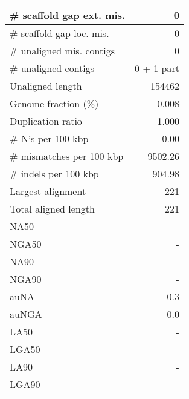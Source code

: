 \documentclass[12pt,a4paper]{article}
\begin{document}
\begin{table}[ht]
\begin{center}
\begin{tabular}{|l*{1}{|r}|}
\# scaffold gap ext. mis. & 0 \\ \hline
\# scaffold gap loc. mis. & 0 \\ \hline
\# unaligned mis. contigs & 0 \\ \hline
\# unaligned contigs & 0 + 1 part \\ \hline
Unaligned length & 154462 \\ \hline
Genome fraction (\%) & 0.008 \\ \hline
Duplication ratio & 1.000 \\ \hline
\# N's per 100 kbp & 0.00 \\ \hline
\# mismatches per 100 kbp & 9502.26 \\ \hline
\# indels per 100 kbp & 904.98 \\ \hline
Largest alignment & 221 \\ \hline
Total aligned length & 221 \\ \hline
NA50 & - \\ \hline
NGA50 & - \\ \hline
NA90 & - \\ \hline
NGA90 & - \\ \hline
auNA & 0.3 \\ \hline
auNGA & 0.0 \\ \hline
LA50 & - \\ \hline
LGA50 & - \\ \hline
LA90 & - \\ \hline
LGA90 & - \\ \hline
\end{tabular}
\end{center}
\end{table}
\end{document}
